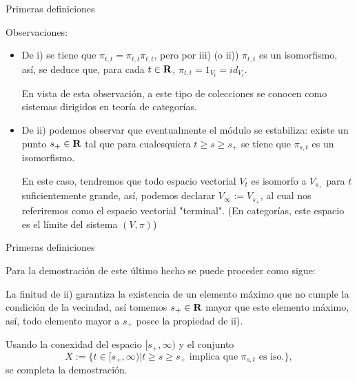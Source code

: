 \documentclass{beamer}
\def\R\re
\def \R{{\bf R}}
\def \re{{\mathbb R}}
\begin{document}
\begin{frame}{Primeras definiciones}
\begin{block}{Observaciones:}
    \begin{itemize}
        \item De i) se tiene que $\pi_{t,t}=\pi_{t,t}\pi_{t,t}$, pero por iii) (o ii)) $\pi_{t,t}$ es un isomorfismo, así, se deduce que, para cada $t\in\R$, $\pi_{t,t}=1_{V_t}=id_{V_t}$. 
        \vfill

        \pause

        En vista de esta observación, a este tipo de colecciones se conocen como sistemas dirigidos en teoría de categorías.

        \vfill
        \pause

        \item De ii) podemos observar que eventualmente el módulo se estabiliza: existe un punto $s_+\in\R$ tal que para cualesquiera $t\geq s\geq s_+$ se tiene que $\pi_{s,t}$ es un isomorfismo.
        
        \pause
        En este caso, tendremos que todo espacio vectorial $V_t$ es isomorfo a $V_{s_+}$ para $t$ suficientemente grande, así, podemos declarar $V_{\infty}:=V_{s_+}$, al cual nos referiremos como el espacio vectorial "terminal". (En categorías, este espacio es el límite del sistema $(V,\pi)$)
        
    \end{itemize}
 
\end{block}

\end{frame}

\begin{frame}{Primeras definiciones}

Para la demostración de este último hecho se puede proceder como sigue:

\pause

La finitud de ii) garantiza la existencia de un elemento máximo que no cumple la condición de la vecindad, así tomemos $s_+\in\R$ mayor que este elemento máximo, así, todo elemento mayor a $s_+$ posee la propiedad de ii).

\pause

Usando la conexidad del espacio $[s_+,\infty)$ y el conjunto 
$$X:=\{t\in[s_+,\infty)| t\geq s\geq s_{+} \text{ implica que } \pi_{s,t} \text{ es iso.}\},$$ se completa la demostración.
    
\end{frame}
\end{document}
